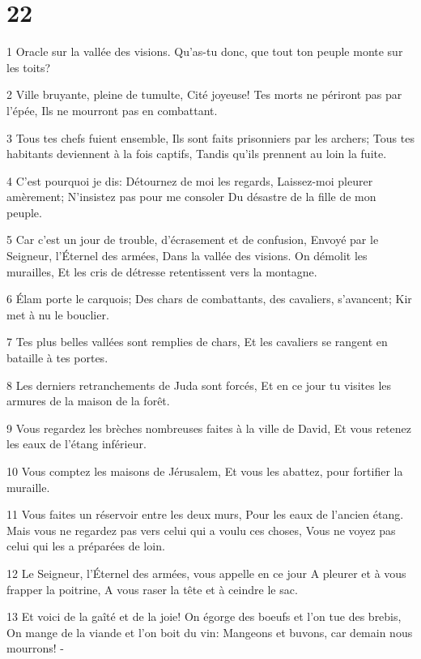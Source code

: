 \chapter{22}

\par 1 Oracle sur la vallée des visions. Qu'as-tu donc, que tout ton peuple monte sur les toits?
\par 2 Ville bruyante, pleine de tumulte, Cité joyeuse! Tes morts ne périront pas par l'épée, Ils ne mourront pas en combattant.
\par 3 Tous tes chefs fuient ensemble, Ils sont faits prisonniers par les archers; Tous tes habitants deviennent à la fois captifs, Tandis qu'ils prennent au loin la fuite.
\par 4 C'est pourquoi je dis: Détournez de moi les regards, Laissez-moi pleurer amèrement; N'insistez pas pour me consoler Du désastre de la fille de mon peuple.
\par 5 Car c'est un jour de trouble, d'écrasement et de confusion, Envoyé par le Seigneur, l'Éternel des armées, Dans la vallée des visions. On démolit les murailles, Et les cris de détresse retentissent vers la montagne.
\par 6 Élam porte le carquois; Des chars de combattants, des cavaliers, s'avancent; Kir met à nu le bouclier.
\par 7 Tes plus belles vallées sont remplies de chars, Et les cavaliers se rangent en bataille à tes portes.
\par 8 Les derniers retranchements de Juda sont forcés, Et en ce jour tu visites les armures de la maison de la forêt.
\par 9 Vous regardez les brèches nombreuses faites à la ville de David, Et vous retenez les eaux de l'étang inférieur.
\par 10 Vous comptez les maisons de Jérusalem, Et vous les abattez, pour fortifier la muraille.
\par 11 Vous faites un réservoir entre les deux murs, Pour les eaux de l'ancien étang. Mais vous ne regardez pas vers celui qui a voulu ces choses, Vous ne voyez pas celui qui les a préparées de loin.
\par 12 Le Seigneur, l'Éternel des armées, vous appelle en ce jour A pleurer et à vous frapper la poitrine, A vous raser la tête et à ceindre le sac.
\par 13 Et voici de la gaîté et de la joie! On égorge des boeufs et l'on tue des brebis, On mange de la viande et l'on boit du vin: Mangeons et buvons, car demain nous mourrons! -
